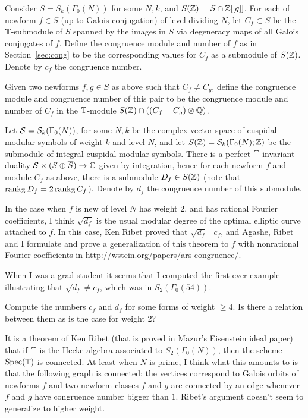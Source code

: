 \documentclass{article}
\begin{document}
Consider $S=S_k(\Gamma_0(N))$ for some $N,k$, and $S(\mathbb{Z})=S\cap
\mathbb{Z}[[q]]$.  For each of newform $f\in S$ (up to Galois conjugation) of
level dividing $N$, let $C_f \subset S$ be the $\mathbb{T}$-submodule of $S$
spanned by the images in $S$ via degeneracy maps of all Galois
conjugates of $f$.  Define the congruence module and number of $f$ as
in Section~\ref{sec:cong} to be the corresponding values for $C_f$ as
a submodule of $S(\mathbb{Z})$.  Denote by $c_f$ the congruence number.

Given two newforms $f,g \in S$ as above such that $C_f \neq C_g$, define
the congruence module and congruence number of this pair to be
the congruence module and number of $C_f$ in the $\mathbb{T}$-module
$S(\mathbb{Z})\cap((C_f + C_g)\otimes\mathbb{Q})$.

Let $\mathcal{S} = \mathcal{S}_k(\Gamma_0(N))$, for some $N,k$ be the complex vector
space of cuspidal modular symbols of weight $k$ and level $N$, and let
$S(\mathbb{Z}) = \mathcal{S}_k(\Gamma_0(N);\mathbb{Z})$ be the submodule of integral cuspidal
modular symbols.  There is a perfect $\mathbb{T}$-invariant duality $\mathcal{S}
\times (S \oplus \overline{S}) \to \mathbb{C}$ given by integration, hence for
each newform $f$ and module $C_f$ as above, there is a submodule $D_f
\in S(\mathbb{Z})$ (note that $\operatorname{rank}_{\mathbb{Z}} D_f = 2\operatorname{rank}_{\mathbb{Z}} C_f$).  Denote by
$d_f$ the congruence number of this submodule.

In the case when $f$ is new of level $N$ has weight $2$, and has
rational Fourier coefficients, I think $\sqrt{d_f}$ is the usual
modular degree of the optimal elliptic curve attached to $f$.
In this case, Ken Ribet proved that $\sqrt{d_f} \mid c_f$, 
and Agashe, Ribet and I formulate and prove a generalization
of this theorem to $f$ with nonrational Fourier coefficients in
\url{http://wstein.org/papers/ars-congruence/}.

When I was a grad student it seems that I computed the first ever
example illustrating that $\sqrt{d_f} \neq c_f$, which was in
$S_2(\Gamma_0(54))$. 


\vspace{1em}
 Compute the numbers $c_f$ and $d_f$ for
some forms of weight $\geq 4$.  Is there a relation between
them as is the case for weight $2$?  


It is a theorem of Ken Ribet (that is proved in Mazur's Eisenstein
ideal paper) that if $\mathbb{T}$ is the Hecke algebra associated to
$S_2(\Gamma_0(N))$, then the scheme $\operatorname{Spec}(\mathbb{T})$ is connected.  At
least when $N$ is prime, I think what this amounts to is that the
following graph is connected: the vertices correspond to Galois orbits
of newforms $f$ and two newform classes $f$ and $g$ are connected by
an edge whenever $f$ and $g$ have congruence number bigger than $1$.
Ribet's argument doesn't seem to generalize to higher weight. 
\end{document}
